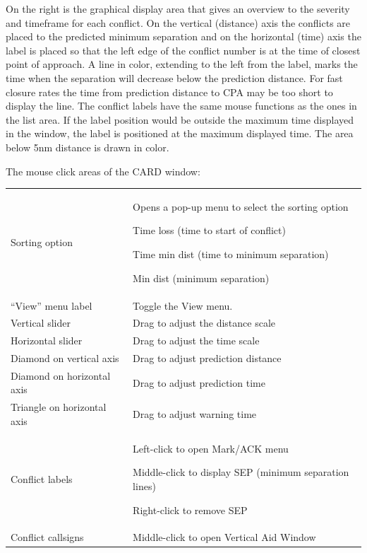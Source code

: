 \documentclass[a4paper,oneside,11pt]{memoir}
\begin{document}
\bigskip

On the right is the graphical display area that gives an overview to the severity and timeframe for each conflict. On the vertical (distance) axis the conflicts are placed to the predicted minimum separation and on the horizontal (time) axis the label is placed so that the left edge of the conflict number is at the time of closest point of approach. A line in  color, extending to the left from the label, marks the time when the separation will decrease below the prediction distance. For fast closure rates the time from prediction distance to CPA may be too short to display the line. The conflict labels have the same mouse functions as the ones in the list area. If the label position would be outside the maximum time displayed in the window, the label is positioned at the maximum displayed time. The area below 5nm distance is drawn in  color.

\bigskip

The mouse click areas of the CARD window:

\begin{longtable}{p{5.5cm} p{7cm}}
  Sorting option              & Opens a pop-up menu to select the sorting option
                                  
                                Time loss (time to start of conflict)

                                Time min dist (time to minimum separation)

                                Min dist (minimum separation)\\
  “View” menu label           & Toggle the View menu.\\
  Vertical slider             & Drag to adjust the distance scale\\
  Horizontal slider           & Drag to adjust the time scale\\
  Diamond on vertical axis    & Drag to adjust prediction distance    \\
  Diamond on horizontal axis  & Drag to adjust prediction time\\
  Triangle on horizontal axis & Drag to adjust warning time\\
  Conflict labels             & Left-click to open Mark/ACK menu

                                Middle-click to display SEP (minimum separation lines)  

                                Right-click to remove SEP\\
  Conflict callsigns          & Middle-click to open Vertical Aid Window\\
\end{longtable}
\end{document}
